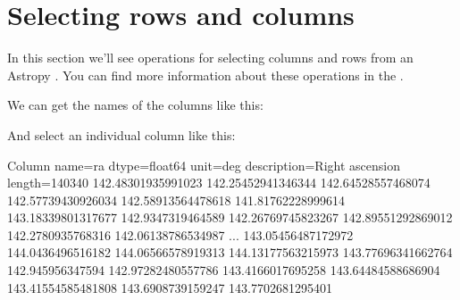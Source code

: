 \documentclass[letterpaper,10pt,english]{sphinxmanual}
\begin{document}
\section{Selecting rows and columns}
\label{\detokenize{03_motion:selecting-rows-and-columns}}
In this section we’ll see operations for selecting columns and rows from an Astropy .  You can find more information about these operations in the .

We can get the names of the columns like this:

\begin{sphinxVerbatim}[commandchars=\\\{\}]
\end{sphinxVerbatim}

\begin{sphinxVerbatim}
\end{sphinxVerbatim}

And select an individual column like this:

\begin{sphinxVerbatim}[commandchars=\\\{\}]
\PYG{p}{[}\PYG{p}{]}
\end{sphinxVerbatim}

\begin{sphinxVerbatim}[commandchars=\\\{\}]
\PYGZlt{}Column name=\PYGZsq{}ra\PYGZsq{} dtype=\PYGZsq{}float64\PYGZsq{} unit=\PYGZsq{}deg\PYGZsq{} description=\PYGZsq{}Right ascension\PYGZsq{} length=140340\PYGZgt{}
142.48301935991023
142.25452941346344
142.64528557468074
142.57739430926034
142.58913564478618
141.81762228999614
143.18339801317677
 142.9347319464589
142.26769745823267
142.89551292869012
 142.2780935768316
142.06138786534987
               ...
143.05456487172972
 144.0436496516182
144.06566578919313
144.13177563215973
143.77696341662764
  142.945956347594
142.97282480557786
 143.4166017695258
143.64484588686904
143.41554585481808
 143.6908739159247
 143.7702681295401
\end{sphinxVerbatim}
\end{document}
